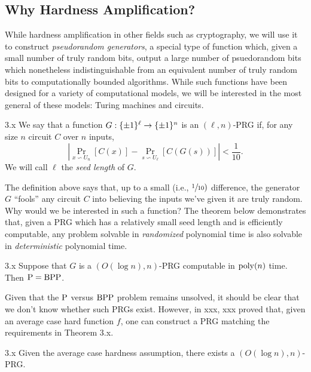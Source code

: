 \documentclass[11pt]{article}
\begin{document}
\subsection{Why Hardness Amplification?}

While hardness amplification in other fields such as cryptography, we will use it to construct \emph{pseudorandom generators}, a special type of function which, given a small number of truly random bits, output a large number of psuedorandom bits which nonetheless indistinguishable from an equivalent number of truly random bits to computationally bounded algorithms. While such functions have been designed for a variety of computational models, we will be interested in the most general of these models: Turing machines and circuits.

\begin{definition}{3.x}
    We say that a function $G : \pmo^\ell \rightarrow \pmo^{n}$ is an $(\ell, n)$-PRG if, for any size $n$ circuit $C$ over $n$ inputs, 
    \begin{equation*}
        \left|\Pr_{x \backsim U_n}[C(x)] - \Pr_{s \backsim U_\ell}[C(G(s))]\right| < \frac{1}{10}.
    \end{equation*}
    We will call $\ell$ the \emph{seed length} of $G$.
\end{definition}

The definition above says that, up to a small (i.e., $\sfrac{1}{10})$ difference, the generator $G$ ``fools'' any circuit $C$ into believing the inputs we've given it are truly random. Why would we be interested in such a function? The theorem below demonstrates that, given a PRG which has a relatively small seed length and is efficiently computable, any problem solvable in \emph{randomized} polynomial time is also solvable in \emph{deterministic} polynomial time.

\begin{theorem}{3.x} Suppose that $G$ is a $(O(\log n), n)$-PRG computable in $\poly(n)$ time. Then $\P = \BPP$.
\end{theorem}

Given that the $\P$ versus $\BPP$ problem remains unsolved, it should be clear that we don't know whether such PRGs exist. However, in xxx, xxx proved that, given an average case hard function $f$, one can construct a PRG matching the requirements in Theorem 3.x.

\begin{theorem}{3.x}
    Given the average case hardness assumption, there exists a $(O(\log n), n)$-PRG.
\end{theorem}
\end{document}
